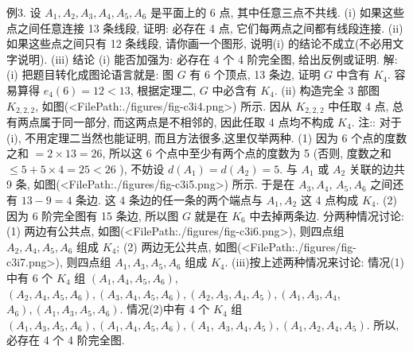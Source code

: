 例3. 设 $A_1, A_2, A_3, A_4, A_5, A_6$ 是平面上的 6 点, 其中任意三点不共线.
(i) 如果这些点之间任意连接 13 条线段, 证明: 必存在 4 点, 它们每两点之间都有线段连接.
(ii)如果这些点之间只有 12 条线段, 请你画一个图形, 说明(i) 的结论不成立(不必用文字说明).
(iii) 结论 (i) 能否加强为: 必存在 4 个 4 阶完全图, 给出反例或证明.
解:(i) 把题目转化成图论语言就是: 图 $G$ 有 6 个顶点, 13 条边, 证明 $G$ 中含有 $K_4$.
容易算得 $e_4(6)=12<13$, 根据定理二, $G$ 中必含有 $K_4$.
(ii) 构造完全 3 部图 $K_{2,2,2}$, 如图(<FilePath:./figures/fig-c3i4.png>) 所示.
因从 $K_{2,2,2}$ 中任取 4 点, 总有两点属于同一部分, 而这两点是不相邻的, 因此任取 4 点均不构成 $K_4$.
注:: 对于 (i), 不用定理二当然也能证明, 而且方法很多,这里仅举两种.
(1) 因为 6 个点的度数之和 $=2 \times 13=26$, 所以这 6 个点中至少有两个点的度数为 5 (否则, 度数之和 $\leqslant 5+5 \times 4=25<26$ ), 不妨设 $d\left(A_1\right)= d\left(A_2\right)=5$. 与 $A_1$ 或 $A_2$ 关联的边共 9 条, 如图(<FilePath:./figures/fig-c3i5.png>) 所示.
于是在 $A_3, A_4$, $A_5, A_6$ 之间还有 $13-9=4$ 条边.
这 4 条边的任一条的两个端点与 $A_1, A_2$ 这 4 点构成 $K_4$.
(2) 因为 6 阶完全图有 15 条边, 所以图 $G$ 就是在 $K_6$ 中去掉两条边.
分两种情况讨论:
(1) 两边有公共点, 如图(<FilePath:./figures/fig-c3i6.png>), 则四点组 $A_2, A_4, A_5, A_6$ 组成 $K_4$;
(2) 两边无公共点, 如图(<FilePath:./figures/fig-c3i7.png>), 则四点组 $A_1, A_3, A_5, A_6$ 组成 $K_4$.
(iii)按上述两种情况来讨论: 情况(1)中有 6 个 $K_4$ 组 $\left(A_1, A_4, A_5, A_6\right)$, $\left(A_2, A_4, A_5, A_6\right),\left(A_3, A_4, A_5, A_6\right),\left(A_2, A_3, A_4, A_5\right),\left(A_1, A_3, A_4\right.$,
$\left.A_6\right),\left(A_1, A_3, A_5, A_6\right)$.
情况(2)中有 4 个 $K_4$ 组 $\left(A_1, A_3, A_5, A_6\right),\left(A_1, A_4, A_5, A_6\right),\left(A_1\right.$, $\left.A_3, A_4, A_5\right),\left(A_1, A_2, A_4, A_5\right)$.
所以,必存在 4 个 4 阶完全图.



